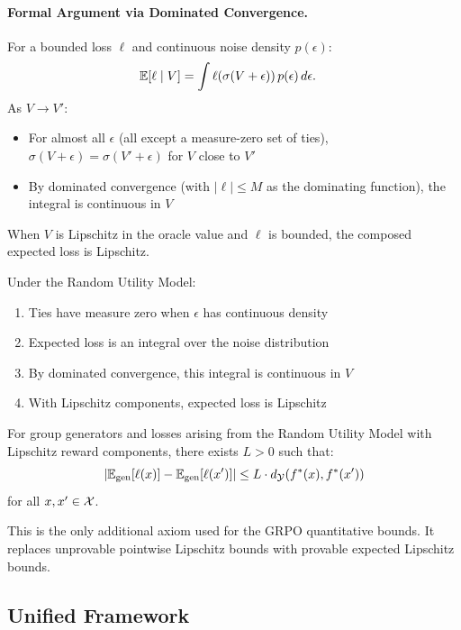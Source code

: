 \paragraph{Formal Argument via Dominated Convergence.}
For a bounded loss $\ell$ and continuous noise density $p(\epsilon)$:
\begin{align*}
\mathbb{E}[\ell \mid V] &= \int \ell(\sigma(V + \epsilon)) \, p(\epsilon) \, d\epsilon.
\end{align*}
As $V \to V'$:
\begin{itemize}
    \item For almost all $\epsilon$ (all except a measure-zero set of ties), $\sigma(V + \epsilon) = \sigma(V' + \epsilon)$ for $V$ close to $V'$
    \item By dominated convergence (with $|\ell| \le M$ as the dominating function), the integral is continuous in $V$
\end{itemize}
When $V$ is Lipschitz in the oracle value and $\ell$ is bounded, the composed expected loss is Lipschitz.

Under the Random Utility Model:
\begin{enumerate}
    \item Ties have measure zero when $\epsilon$ has continuous density
    \item Expected loss is an integral over the noise distribution
    \item By dominated convergence, this integral is continuous in $V$
    \item With Lipschitz components, expected loss is Lipschitz
\end{enumerate}

\begin{axiom}\label{axiom:expected-lip}
For group generators and losses arising from the Random Utility Model with Lipschitz reward components, there exists $L > 0$ such that:
\[
|\mathbb{E}_{\text{gen}}[\ell(x)] - \mathbb{E}_{\text{gen}}[\ell(x')]| \le L \cdot d_{\mathcal{Y}}(f^{\ast}(x), f^{\ast}(x'))
\]
for all $x, x' \in \mathcal{X}$.
\end{axiom}

This is the only additional axiom used for the GRPO quantitative bounds. It replaces unprovable pointwise Lipschitz bounds with provable expected Lipschitz bounds.

\subsection{Unified Framework}

